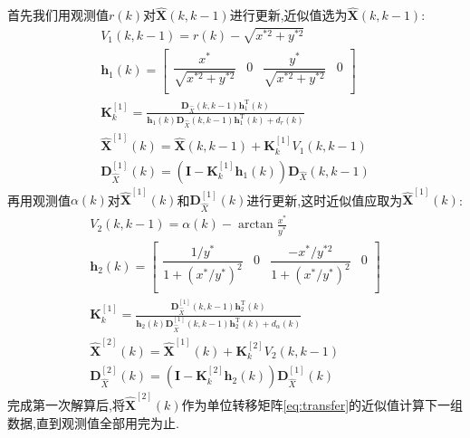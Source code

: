 \documentclass[cn,10pt,citestyle=gb7714-2015,bibstyle=gb7714-2015]{elegantbook}
\newcommand{\mT}{\mathrm{T}}
\begin{document}
\begin{solution}
    首先我们用观测值$r(k)$对$\bm{\hat{X}}\left( k,k-1 \right)$进行更新,近似值选为$\bm{\hat{X}}\left( k,k-1 \right)$:
    \begin{gather}
        V_1\left( k,k-1 \right) =r\left( k \right) -\sqrt{x^{*2}+y^{*2}} \label{eq:15}
        \\
        \bm{h}_1\left( k \right) =\left[ \begin{matrix}
            \dfrac{x^*}{\sqrt{x^{*2}+y^{*2}}}&		0&		\dfrac{y^*}{\sqrt{x^{*2}+y^{*2}}}&		0\\
        \end{matrix} \right] 
        \\
        \bm{K}_{k}^{\left[ 1 \right]}=\frac{\bm{D}_{\hat{X}}\left( k,k-1 \right) \bm{h}_{1}^{\mT}\left( k \right)}{\bm{h}_1\left( k \right) \bm{D}_{\hat{X}}\left( k,k-1 \right) \bm{h}_{1}^{\mT}\left( k \right) +d_r\left( k \right)}
        \\
        \bm{\hat{X}}^{\left[ 1 \right]}\left( k \right) =\bm{\hat{X}}\left( k,k-1 \right) +\bm{K}_{k}^{\left[ 1 \right]}V_1\left( k,k-1 \right) 
        \\
        \bm{D}_{\hat{X}}^{\left[ 1 \right]}\left( k \right) =\left( \bm{I}-\bm{K}_{k}^{\left[ 1 \right]}\bm{h}_1\left( k \right) \right) \bm{D}_{\hat{X}}\left( k,k-1 \right) \label{eq:19}
    \end{gather}
    再用观测值$\alpha(k)$对$\bm{\hat{X}}^{\left[ 1 \right]}\left( k \right) $和$\bm{D}_{\hat{X}}^{\left[ 1 \right]}\left( k \right) $进行更新,这时近似值应取为$\bm{\hat{X}}^{\left[ 1 \right]}\left( k \right) $:
    \begin{gather}
        V_2\left( k,k-1 \right) =\alpha \left( k \right) -\arctan \frac{x^*}{y^*} \label{eq:20}
        \\
        \bm{h}_2\left( k \right) =\left[ \begin{matrix}
            \dfrac{1/y^*}{1+\left( x^*/y^* \right) ^2}&		0&		\dfrac{-x^*/y^{*2}}{1+\left( x^*/y^* \right) ^2}&		0\\
        \end{matrix} \right] 
        \\
        \bm{K}_{k}^{\left[ 1 \right]}=\frac{\bm{D}_{\hat{X}}^{\left[ 1 \right]}\left( k,k-1 \right) \bm{h}_{2}^{\mT}\left( k \right)}{\bm{h}_2\left( k \right) \bm{D}_{\hat{X}}^{\left[ 1 \right]}\left( k,k-1 \right) \bm{h}_{2}^{\mT}\left( k \right) +d_{\alpha}\left( k \right)}
        \\
        \bm{\hat{X}}^{\left[ 2 \right]}\left( k \right) =\bm{\hat{X}}^{\left[ 1 \right]}\left( k \right) +\bm{K}_{k}^{\left[ 2 \right]}V_2\left( k,k-1 \right) 
        \\
        \bm{D}_{\hat{X}}^{\left[ 2 \right]}\left( k \right) =\left( \bm{I}-\bm{K}_{k}^{\left[ 2 \right]}\bm{h}_2\left( k \right) \right) \bm{D}_{\hat{X}}^{\left[ 1 \right]}\left( k \right) \label{eq:24}
    \end{gather}
    完成第一次解算后,将$\bm{\hat{X}}^{\left[ 2 \right]}\left( k \right) $作为单位转移矩阵\eqref{eq:transfer}的近似值计算下一组数据,直到观测值全部用完为止.
\end{solution}
\end{document}
